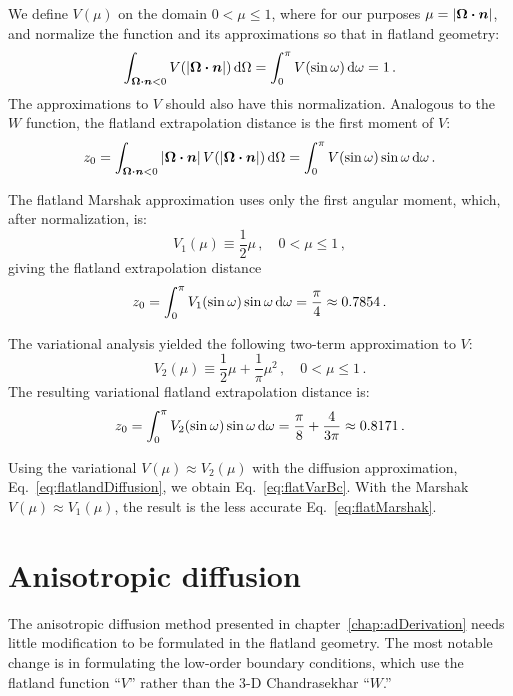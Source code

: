 We define $V(\mu)$ on the domain $0 < \mu \le 1$, where for our purposes $\mu =
\left| \bm{\Omega} \bm{\cdot} \bm{n} \right|$, and normalize the function and its
approximations so that in flatland geometry:
\begin{equation*}
  \int_{\bm{\Omega}\bm{\cdot}\bm{n} < 0} V( \left| \bm{\Omega}\bm{\cdot}\bm{n} \right|) \mathop{}\!\mathrm{d}\Omega
  = \int_{0}^{\pi} V(\sin\omega) \mathop{}\!\mathrm{d}\omega
  = 1 \,.
\end{equation*}
The approximations to $V$ should also have this normalization. Analogous to the
$W$ function, the flatland extrapolation distance is the first moment of $V$:
\begin{equation*}
  z_0 = \int_{\bm{\Omega}\bm{\cdot}\bm{n} < 0} \left| \bm{\Omega}\bm{\cdot}\bm{n} \right|
    V( \left| \bm{\Omega}\bm{\cdot}\bm{n} \right|) \mathop{}\!\mathrm{d}\Omega
  = \int_{0}^{\pi} V(\sin\omega) \sin\omega \mathop{}\!\mathrm{d}\omega \,.
\end{equation*}

The flatland Marshak approximation uses only the first angular moment, which,
after normalization, is:
\begin{equation}\label{eq:flatV1}
  V_1(\mu) \equiv \frac{1}{2} \mu \,,
  \quad 0 < \mu \le 1 \,,
\end{equation}
giving the flatland extrapolation distance
\begin{equation*}
 z_0 = \int_{0}^{\pi} V_1(\sin\omega) \sin\omega \mathop{}\!\mathrm{d}\omega
  = \frac{\pi}{4} \approx 0.7854 \,.
\end{equation*}

The variational analysis yielded the following two-term approximation to $V$:
\begin{equation}\label{eq:flatV2}
  V_2(\mu) \equiv \frac{1}{2} \mu + \frac{1}{\pi}\mu^2 \,,
  \quad 0 < \mu \le 1 \,.
\end{equation}
The resulting variational flatland extrapolation distance is:
\begin{equation*}
 z_0 = \int_{0}^{\pi} V_2(\sin\omega) \sin\omega \mathop{}\!\mathrm{d}\omega
  = \frac{\pi}{8} + \frac{4}{3\pi} \approx 0.8171\,.
\end{equation*}

Using the variational $V(\mu)\approx V_2(\mu)$ with the diffusion
approximation, Eq.~\eqref{eq:flatlandDiffusion}, we obtain
Eq.~\eqref{eq:flatVarBc}. With the Marshak $V(\mu)\approx V_1(\mu)$, the result
is the less accurate Eq.~\eqref{eq:flatMarshak}.

\section{Anisotropic diffusion}
The anisotropic diffusion method presented in
chapter~\ref{chap:adDerivation} needs little modification to be formulated
in the flatland geometry. The most notable change is in formulating the
low-order boundary conditions, which use the flatland function ``$V$'' rather
than the 3-D Chandrasekhar ``$W$.''

